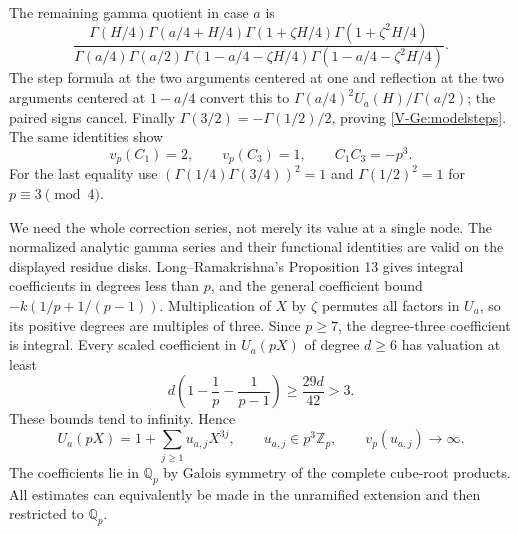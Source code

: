 \documentclass[11pt,letterpaper]{article}
\numberwithin{equation}{section}
\begin{document}
The remaining gamma quotient in case $a$ is
\[
\frac{\Gamma(H/4)\Gamma(a/4+H/4)
 \Gamma(1+\zeta H/4)\Gamma(1+\zeta^2H/4)}
 {\Gamma(a/4)\Gamma(a/2)
  \Gamma(1-a/4-\zeta H/4)\Gamma(1-a/4-\zeta^2H/4)}.
\]
The step formula at the two arguments centered at one and reflection
at the two arguments centered at $1-a/4$ convert this to
$\Gamma(a/4)^2U_a(H)/\Gamma(a/2)$; the paired signs cancel.
Finally $\Gamma(3/2)=-\Gamma(1/2)/2$, proving
\eqref{V-Ge:modelsteps}. The same identities show
\begin{equation}\label{V-Ge:constantproduct}
 v_p(C_1)=2,\qquad v_p(C_3)=1,\qquad C_1C_3=-p^3.
\end{equation}
For the last equality use
$(\Gamma(1/4)\Gamma(3/4))^2=1$ and
$\Gamma(1/2)^2=1$ for $p\equiv3\pmod4$.

We need the whole correction series, not merely its value at a
single node. The normalized analytic gamma series and their
functional identities are valid on the displayed residue disks.
Long--Ramakrishna's Proposition 13 gives integral coefficients in
degrees less than $p$, and the general coefficient bound
$-k(1/p+1/(p-1))$. Multiplication of $X$ by $\zeta$ permutes all
factors in $U_a$, so its positive degrees are multiples of three.
Since $p\ge7$, the degree-three coefficient is integral. Every
scaled coefficient in $U_a(pX)$ of degree $d\ge6$ has valuation at
least
\[
 d\left(1-\frac1p-\frac1{p-1}\right)
 \ge\frac{29d}{42}>3.
\]
These bounds tend to infinity. Hence
\begin{equation}\label{V-Ge:restricted}
 U_a(pX)=1+\sum_{j\ge1}u_{a,j}X^{3j},\qquad
 u_{a,j}\in p^3\mathbb Z_p,\qquad v_p(u_{a,j})\longrightarrow\infty.
\end{equation}
The coefficients lie in $\mathbb Q_p$ by Galois symmetry of the
complete cube-root products. All estimates can equivalently be
made in the unramified extension and then restricted to $\mathbb Q_p$.
\end{document}
